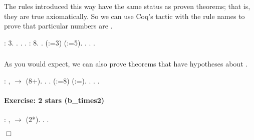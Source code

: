 \documentclass[12pt]{report}
\begin{document}
    The rules introduced this way have the same status as proven 
    theorems; that is, they are true axiomatically. 
    So we can use Coq's  tactic with the rule names to prove 
    that particular numbers are .  \begin{coqdoccode}
\coqdocemptyline
\coqdocnoindent
{} :  3.\coqdoceol
\coqdocnoindent
{}.\coqdoceol
\coqdocindent{1.50em}
 .\coqdoceol
\coqdocnoindent
{}.\coqdoceol
\coqdocemptyline
\coqdocnoindent
{} :  8.\coqdoceol
\coqdocnoindent
{}.\coqdoceol
\coqdocindent{1.50em}
   (:=3) (:=5).\coqdoceol
\coqdocindent{1.50em}
 .\coqdoceol
\coqdocindent{1.50em}
 .\coqdoceol
\coqdocnoindent
{}.\coqdoceol
\coqdocemptyline
\end{coqdoccode}
\subsubsection{ }

 As you would expect, we can also prove theorems that have
hypotheses about . \begin{coqdoccode}
\coqdocemptyline
\coqdocnoindent
{} : \coqdockw{\ensuremath{\forall}} ,   \ensuremath{\rightarrow}  (8+).\coqdoceol
\coqdocnoindent
{}.\coqdoceol
\coqdocindent{1.00em}
  .\coqdoceol
\coqdocindent{1.00em}
   (:=8) (:=).\coqdoceol
\coqdocindent{1.00em}
 .\coqdoceol
\coqdocindent{1.00em}
 .\coqdoceol
\coqdocnoindent
{}.\coqdoceol
\coqdocemptyline
\end{coqdoccode}
\paragraph{Exercise: 2 stars (b\_times2)}

\begin{coqdoccode}
\coqdocnoindent
{} : \coqdockw{\ensuremath{\forall}} ,   \ensuremath{\rightarrow}  (2*).\coqdoceol
\coqdocnoindent
{}.\coqdoceol
 .\coqdoceol
\end{coqdoccode}
\ensuremath{\Box} 
\end{document}

